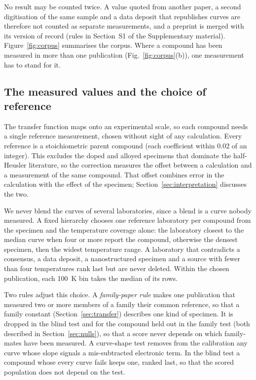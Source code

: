 No result may be counted twice. A value quoted from another paper, a second digitisation of the same
sample and a data deposit that republishes curves are therefore not counted as separate
measurements, and a preprint is merged with its version of record (rules in Section~S1 of the Supplementary material). Figure~\ref{fig:corpus} summarises the corpus. Where a compound has been measured in more than one
publication (Fig.~\ref{fig:corpus}(b)), one measurement has to stand for it.

\subsection{The measured values and the choice of reference}
\label{sec:measured}

The transfer function maps onto an experimental scale, so each compound needs a single reference
measurement, chosen without sight of any calculation. Every reference is a stoichiometric parent
compound (each coefficient within \num{0.02} of an integer). This excludes the doped and alloyed
specimens that dominate the half-Heusler literature, so the correction measures the offset between a
calculation and a measurement of the same compound. That offset combines error in the calculation
with the effect of the specimen; Section~\ref{sec:interpretation} discusses the two.

We never blend the curves of several laboratories, since a blend is a curve nobody measured. A fixed
hierarchy chooses one reference laboratory per compound from the specimen and the temperature
coverage alone: the laboratory closest to the median curve when four or more report the compound,
otherwise the densest specimen, then the widest temperature range. A laboratory that contradicts a
consensus, a data deposit, a nanostructured specimen and a source with fewer than four temperatures
rank last but are never deleted. Within the chosen publication, each \SI{100}{\kelvin} bin takes the
median of its rows.

Two rules adjust this choice. A \emph{family-paper rule} makes one publication that measured two or
more members of a family their common reference, so that a family constant (Section~\ref{sec:transfer}) describes one kind of
specimen. It is dropped in the blind test and for the compound held out in the family test (both described
in Section~\ref{sec:nulls}), so that
a score never depends on which family-mates have been measured. A curve-shape test removes from the
calibration any curve whose slope signals a mis-subtracted electronic term. In the blind test a
compound whose every curve fails keeps one, ranked last, so that the scored population does not
depend on the test.

